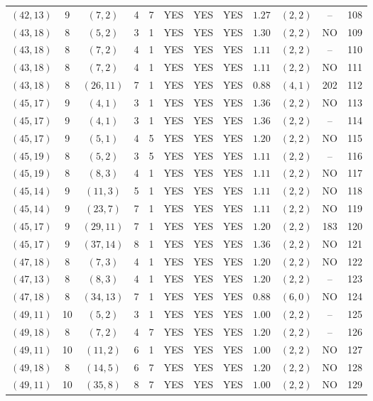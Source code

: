 \begin{longtable}{|c|c|c|c|c|c|c|c|c|c|c|c|}
$(42,13)$ & 9 & $(7,2)$ & 4 & 7 & YES & YES & YES & $1.27$ & $(2,2)$ & -- & 108\\
$(43,18)$ & 8 & $(5,2)$ & 3 & 1 & YES & YES & YES & $1.30$ & $(2,2)$ & NO & 109\\
$(43,18)$ & 8 & $(7,2)$ & 4 & 1 & YES & YES & YES & $1.11$ & $(2,2)$ & -- & 110\\
$(43,18)$ & 8 & $(7,2)$ & 4 & 1 & YES & YES & YES & $1.11$ & $(2,2)$ & NO & 111\\
$(43,18)$ & 8 & $(26,11)$ & 7 & 1 & YES & YES & YES & $0.88$ & $(4,1)$ & 202 & 112\\
$(45,17)$ & 9 & $(4,1)$ & 3 & 1 & YES & YES & YES & $1.36$ & $(2,2)$ & NO & 113\\
$(45,17)$ & 9 & $(4,1)$ & 3 & 1 & YES & YES & YES & $1.36$ & $(2,2)$ & -- & 114\\
$(45,17)$ & 9 & $(5,1)$ & 4 & 5 & YES & YES & YES & $1.20$ & $(2,2)$ & NO & 115\\
$(45,19)$ & 8 & $(5,2)$ & 3 & 5 & YES & YES & YES & $1.11$ & $(2,2)$ & -- & 116\\
$(45,19)$ & 8 & $(8,3)$ & 4 & 1 & YES & YES & YES & $1.11$ & $(2,2)$ & NO & 117\\
$(45,14)$ & 9 & $(11,3)$ & 5 & 1 & YES & YES & YES & $1.11$ & $(2,2)$ & NO & 118\\
$(45,14)$ & 9 & $(23,7)$ & 7 & 1 & YES & YES & YES & $1.11$ & $(2,2)$ & NO & 119\\
$(45,17)$ & 9 & $(29,11)$ & 7 & 1 & YES & YES & YES & $1.20$ & $(2,2)$ & 183 & 120\\
$(45,17)$ & 9 & $(37,14)$ & 8 & 1 & YES & YES & YES & $1.36$ & $(2,2)$ & NO & 121\\
$(47,18)$ & 8 & $(7,3)$ & 4 & 1 & YES & YES & YES & $1.20$ & $(2,2)$ & NO & 122\\
$(47,13)$ & 8 & $(8,3)$ & 4 & 1 & YES & YES & YES & $1.20$ & $(2,2)$ & -- & 123\\
$(47,18)$ & 8 & $(34,13)$ & 7 & 1 & YES & YES & YES & $0.88$ & $(6,0)$ & NO & 124\\
$(49,11)$ & 10 & $(5,2)$ & 3 & 1 & YES & YES & YES & $1.00$ & $(2,2)$ & -- & 125\\
$(49,18)$ & 8 & $(7,2)$ & 4 & 7 & YES & YES & YES & $1.20$ & $(2,2)$ & -- & 126\\
$(49,11)$ & 10 & $(11,2)$ & 6 & 1 & YES & YES & YES & $1.00$ & $(2,2)$ & NO & 127\\
$(49,18)$ & 8 & $(14,5)$ & 6 & 7 & YES & YES & YES & $1.20$ & $(2,2)$ & NO & 128\\
$(49,11)$ & 10 & $(35,8)$ & 8 & 7 & YES & YES & YES & $1.00$ & $(2,2)$ & NO & 129\\

\end{longtable}
